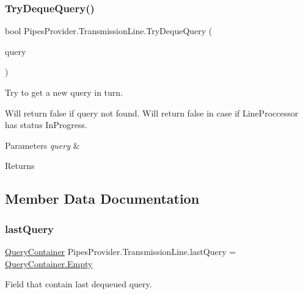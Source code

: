 \subsubsection{\texorpdfstring{Try\+Deque\+Query()}{TryDequeQuery()}}
{\footnotesize\ttfamily bool Pipes\+Provider.\+Transmission\+Line.\+Try\+Deque\+Query (\begin{DoxyParamCaption}\item[{out \mbox{\hyperlink{struct_pipes_provider_1_1_query_container}{Query\+Container}}}]{query }\end{DoxyParamCaption})}



Try to get a new query in turn. 

Will return false if query not found. Will return false in case if Line\+Proccessor has status In\+Progress. 


\begin{DoxyParams}{Parameters}
{\em query} & \\
\hline
\end{DoxyParams}
\begin{DoxyReturn}{Returns}

\end{DoxyReturn}


\subsection{Member Data Documentation}
\mbox{\label{class_pipes_provider_1_1_transmission_line_affdde0eafb483f2bf6f874679b4ab6f8}} 
\subsubsection{\texorpdfstring{last\+Query}{lastQuery}}
{\footnotesize\ttfamily \mbox{\hyperlink{struct_pipes_provider_1_1_query_container}{Query\+Container}} Pipes\+Provider.\+Transmission\+Line.\+last\+Query = \mbox{\hyperlink{struct_pipes_provider_1_1_query_container_a3daff9827ee4f77286eb4385a64e2fe2}{Query\+Container.\+Empty}}\hspace{0.3cm}{\ttfamily [protected]}}



Field that contain last dequeued query. 


